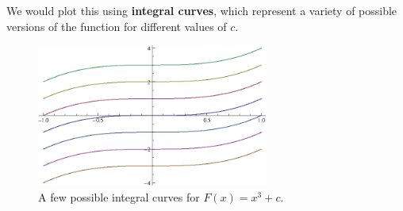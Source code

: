 We would plot this using \textbf{integral curves}, which represent a variety of possible versions of the function for different values of $c$.
\begin{figure}[h]
  \begin{center}
    \includegraphics[width=3in]{continuous/derivatives/intcurves.eps}
  \end{center}
  \caption{A few possible integral curves for $F(x)=x^3+c$.}
\end{figure}
